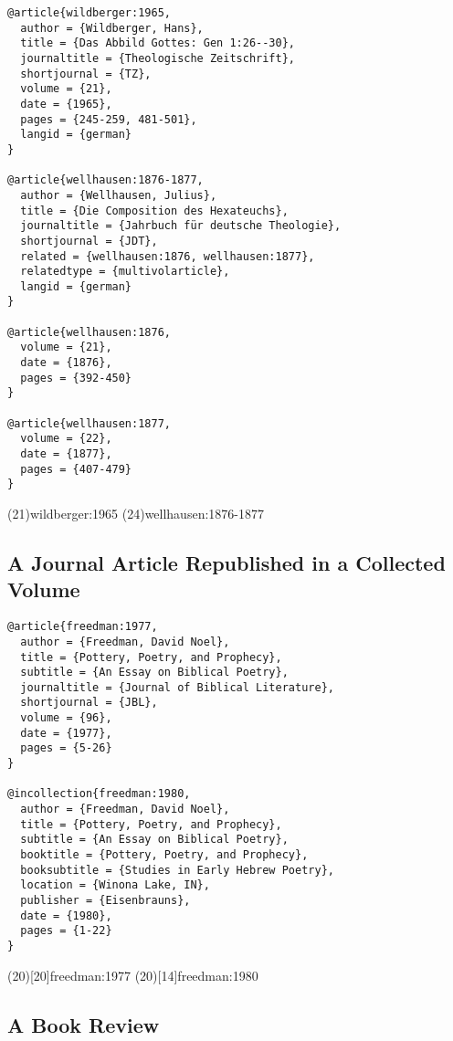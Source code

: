 \documentclass[a4paper]{article}
\begin{document}
\begin{verbatim}
@article{wildberger:1965,
  author = {Wildberger, Hans},
  title = {Das Abbild Gottes: Gen 1:26--30},
  journaltitle = {Theologische Zeitschrift},
  shortjournal = {TZ},
  volume = {21},
  date = {1965},
  pages = {245-259, 481-501},
  langid = {german}
}

@article{wellhausen:1876-1877,
  author = {Wellhausen, Julius},
  title = {Die Composition des Hexateuchs},
  journaltitle = {Jahrbuch für deutsche Theologie},
  shortjournal = {JDT},
  related = {wellhausen:1876, wellhausen:1877},
  relatedtype = {multivolarticle},
  langid = {german}
}

@article{wellhausen:1876,
  volume = {21},
  date = {1876},
  pages = {392-450}
}

@article{wellhausen:1877,
  volume = {22},
  date = {1877},
  pages = {407-479}
}
\end{verbatim}

\examplecite(21){wildberger:1965}
\examplecite(24){wellhausen:1876-1877}
\exampleabbreviations
\examplebibliography

\subsection{A Journal Article Republished in a Collected Volume}

\begin{verbatim}
@article{freedman:1977,
  author = {Freedman, David Noel},
  title = {Pottery, Poetry, and Prophecy},
  subtitle = {An Essay on Biblical Poetry},
  journaltitle = {Journal of Biblical Literature},
  shortjournal = {JBL},
  volume = {96},
  date = {1977},
  pages = {5-26}
}

@incollection{freedman:1980,
  author = {Freedman, David Noel},
  title = {Pottery, Poetry, and Prophecy},
  subtitle = {An Essay on Biblical Poetry},
  booktitle = {Pottery, Poetry, and Prophecy},
  booksubtitle = {Studies in Early Hebrew Poetry},
  location = {Winona Lake, IN},
  publisher = {Eisenbrauns},
  date = {1980},
  pages = {1-22}
}
\end{verbatim}

\examplecite(20)[20]{freedman:1977}
\examplecite(20)[14]{freedman:1980}
\exampleabbreviations
\examplebibliography

\subsection{A Book Review}
\end{document}
